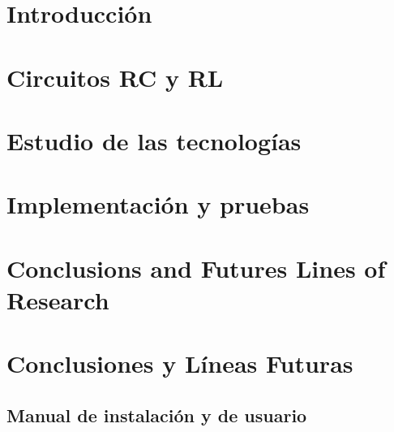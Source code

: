\documentclass[12pt, a4paper, twoside]{article}
\begin{document}


\clearpage
\setcounter{page}{1}



\newpage



\newpage



\tableofcontents

\section{Introducción}


\section{Circuitos RC y RL}


\section{Estudio de las tecnologías}


\section{Implementación y pruebas}


\section{Conclusions and Futures Lines of Research}


\section{Conclusiones y Líneas Futuras}



\printbibliography

\newpage

\begin{umaappendices}
  \section{Manual de instalación y de usuario}
  
\end{umaappendices}
\end{document}
